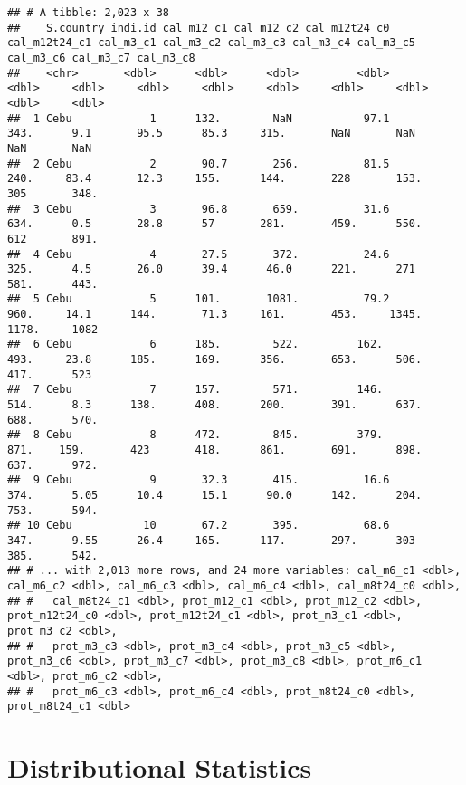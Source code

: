 \documentclass[
]{book}
\begin{document}
\begin{verbatim}
## # A tibble: 2,023 x 38
##    S.country indi.id cal_m12_c1 cal_m12_c2 cal_m12t24_c0 cal_m12t24_c1 cal_m3_c1 cal_m3_c2 cal_m3_c3 cal_m3_c4 cal_m3_c5 cal_m3_c6 cal_m3_c7 cal_m3_c8
##    <chr>       <dbl>      <dbl>      <dbl>         <dbl>         <dbl>     <dbl>     <dbl>     <dbl>     <dbl>     <dbl>     <dbl>     <dbl>     <dbl>
##  1 Cebu            1      132.        NaN           97.1          343.      9.1       95.5      85.3     315.       NaN       NaN       NaN       NaN 
##  2 Cebu            2       90.7       256.          81.5          240.     83.4       12.3     155.      144.       228       153.      305       348.
##  3 Cebu            3       96.8       659.          31.6          634.      0.5       28.8      57       281.       459.      550.      612       891.
##  4 Cebu            4       27.5       372.          24.6          325.      4.5       26.0      39.4      46.0      221.      271       581.      443.
##  5 Cebu            5      101.       1081.          79.2          960.     14.1      144.       71.3     161.       453.     1345.     1178.     1082 
##  6 Cebu            6      185.        522.         162.           493.     23.8      185.      169.      356.       653.      506.      417.      523 
##  7 Cebu            7      157.        571.         146.           514.      8.3      138.      408.      200.       391.      637.      688.      570.
##  8 Cebu            8      472.        845.         379.           871.    159.       423       418.      861.       691.      898.      637.      972.
##  9 Cebu            9       32.3       415.          16.6          374.      5.05      10.4      15.1      90.0      142.      204.      753.      594.
## 10 Cebu           10       67.2       395.          68.6          347.      9.55      26.4     165.      117.       297.      303       385.      542.
## # ... with 2,013 more rows, and 24 more variables: cal_m6_c1 <dbl>, cal_m6_c2 <dbl>, cal_m6_c3 <dbl>, cal_m6_c4 <dbl>, cal_m8t24_c0 <dbl>,
## #   cal_m8t24_c1 <dbl>, prot_m12_c1 <dbl>, prot_m12_c2 <dbl>, prot_m12t24_c0 <dbl>, prot_m12t24_c1 <dbl>, prot_m3_c1 <dbl>, prot_m3_c2 <dbl>,
## #   prot_m3_c3 <dbl>, prot_m3_c4 <dbl>, prot_m3_c5 <dbl>, prot_m3_c6 <dbl>, prot_m3_c7 <dbl>, prot_m3_c8 <dbl>, prot_m6_c1 <dbl>, prot_m6_c2 <dbl>,
## #   prot_m6_c3 <dbl>, prot_m6_c4 <dbl>, prot_m8t24_c0 <dbl>, prot_m8t24_c1 <dbl>
\end{verbatim}

\hypertarget{distributional-statistics}{%
\section{Distributional Statistics}\label{distributional-statistics}}
\end{document}
